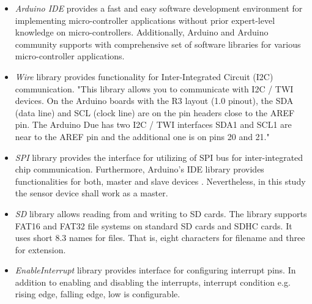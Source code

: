 \documentclass[english,12pt,a4paper,pdftex,elec,utf8]{aaltothesis}
\begin{document}
\begin{itemize}
\item \textit{Arduino IDE} provides a fast and easy software development environment for implementing micro-controller applications without prior expert-level knowledge on micro-controllers. Additionally, Arduino and Arduino community supports with comprehensive set of software libraries for various micro-controller applications.

\item \textit{Wire} library provides functionality for Inter-Integrated Circuit (I2C) communication. "This library allows you to communicate with I2C / TWI devices. On the Arduino boards with the R3 layout (1.0 pinout), the SDA (data line) and SCL (clock line) are on the pin headers close to the AREF pin. The Arduino Due has two I2C / TWI interfaces SDA1 and SCL1 are near to the AREF pin and the additional one is on pins 20 and 21." \cite{arduinowire}

\item \textit{SPI} library provides the interface for utilizing of SPI bus for inter-integrated chip communication. Furthermore, Arduino's IDE library provides functionalities for both, master and slave devices \cite{arduinospi}. Nevertheless, in this study the sensor device shall work as a master. 

\item \textit{SD} library allows reading from and writing to SD cards. The library supports FAT16 and FAT32 file systems on standard SD cards and SDHC cards. It uses short 8.3 names for files. That is, eight characters for filename and three for extension. \cite{arduinosd}

\item \textit{EnableInterrupt} library provides interface for configuring interrupt pins. In addition to enabling and disabling the interrupts, interrupt condition e.g. rising edge, falling edge, low is configurable. \cite{arduinoenableinterrupt}


\end{itemize}
\end{document}
